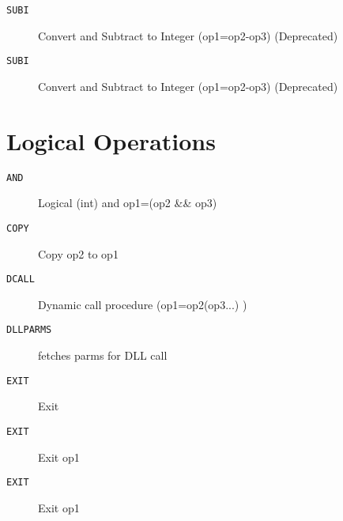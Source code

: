 
\begin{description}
\item[\texttt{SUBI       }]  Convert and Subtract to Integer (op1=op2-op3) (Deprecated)\\
\end{description}

\begin{description}
\item[\texttt{SUBI       }]  Convert and Subtract to Integer (op1=op2-op3) (Deprecated)\\
\end{description}

\section{Logical Operations}
\begin{description}
\item[\texttt{AND        }]  Logical (int) and op1=(op2 \&\& op3)\\
\end{description}

\begin{description}
\item[\texttt{COPY       }]  Copy op2 to op1\\
\end{description}

\begin{description}
\item[\texttt{DCALL      }]  Dynamic call procedure (op1=op2(op3...) )\\
\end{description}

\begin{description}
\item[\texttt{DLLPARMS   }]  fetches parms for DLL call \\
\end{description}

\begin{description}
\item[\texttt{EXIT       }]  Exit\\
\end{description}

\begin{description}
\item[\texttt{EXIT       }]  Exit op1\\
\end{description}

\begin{description}
\item[\texttt{EXIT       }]  Exit op1\\
\end{description}
